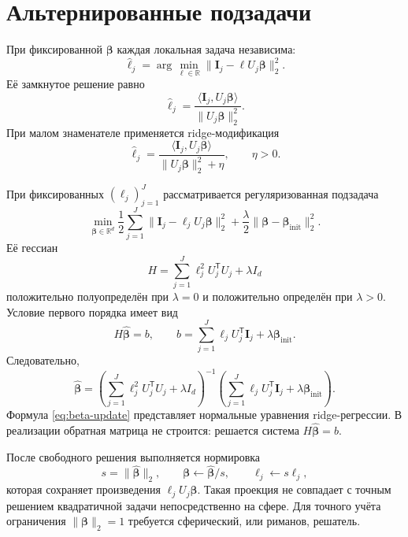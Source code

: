 \documentclass[11pt,a4paper]{article}
\newcommand{\R}{\mathbb{R}}
\newcommand{\T}{\mathsf{T}}
\newcommand{\Id}{I}
\begin{document}
\section*{Альтернированные подзадачи}
При фиксированной $\bm\beta$ каждая локальная задача независима:
\[
\widehat\ell_j
=
\arg\min_{\ell\in\R}
\|\bm I_j-\ell U_j\bm\beta\|_2^2.
\]
Её замкнутое решение равно
\begin{equation}
\widehat\ell_j
=
\frac{\langle\bm I_j,U_j\bm\beta\rangle}
{\|U_j\bm\beta\|_2^2}.
\label{eq:l-update}
\end{equation}
При малом знаменателе применяется ridge-модификация
\[
\widehat\ell_j
=
\frac{\langle\bm I_j,U_j\bm\beta\rangle}
{\|U_j\bm\beta\|_2^2+\eta},
\qquad \eta>0.
\]

При фиксированных $(\ell_j)_{j=1}^{J}$ рассматривается регуляризованная подзадача
\begin{equation}
\min_{\bm\beta\in\R^d}
\frac12\sum_{j=1}^{J}
\|\bm I_j-\ell_jU_j\bm\beta\|_2^2
+
\frac{\lambda}{2}
\|\bm\beta-\bm\beta_{\mathrm{init}}\|_2^2.
\label{eq:beta-subproblem}
\end{equation}
Её гессиан
\[
H=\sum_{j=1}^{J}\ell_j^2U_j^{\T}U_j+\lambda\Id_d
\]
положительно полуопределён при $\lambda=0$ и положительно определён при $\lambda>0$. Условие первого порядка имеет вид
\[
H\widehat{\bm\beta}=b,
\qquad
b=
\sum_{j=1}^{J}\ell_jU_j^{\T}\bm I_j
+
\lambda\bm\beta_{\mathrm{init}}.
\]
Следовательно,
\begin{equation}
\widehat{\bm\beta}
=
\left(
\sum_{j=1}^{J}\ell_j^2U_j^{\T}U_j+\lambda\Id_d
\right)^{-1}
\left(
\sum_{j=1}^{J}\ell_jU_j^{\T}\bm I_j
+\lambda\bm\beta_{\mathrm{init}}
\right).
\label{eq:beta-update}
\end{equation}
Формула \eqref{eq:beta-update} представляет нормальные уравнения ridge-регрессии. В реализации обратная матрица не строится: решается система $H\widehat{\bm\beta}=b$.

После свободного решения выполняется нормировка
\[
s=\|\widehat{\bm\beta}\|_2,
\qquad
\bm\beta\leftarrow\widehat{\bm\beta}/s,
\qquad
\ell_j\leftarrow s\ell_j,
\]
которая сохраняет произведения $\ell_jU_j\bm\beta$. Такая проекция не совпадает с точным решением квадратичной задачи непосредственно на сфере. Для точного учёта ограничения $\|\bm\beta\|_2=1$ требуется сферический, или риманов, решатель.
\end{document}
